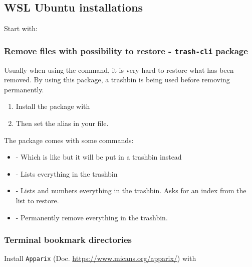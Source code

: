 \subsection{WSL Ubuntu installations} \label{sec:wsl_ubuntu_installations}

Start with:


\subsubsection{Remove files with possibility to restore - \texttt{trash-cli} package}

Usually when using the  command, it is very hard to restore what has been removed. By using this package, a trashbin is being used before removing permanently.

\begin{enumerate}
    \item Install the  package with 
    \item Then set the alias  in your  file.
\end{enumerate}


The  package comes with some commands:
\begin{itemize}
    \item {} - Which is like  but it will be put in a trashbin instead
    \item {} - Lists everything in the trashbin
    \item {} - Lists and numbers everything in the trashbin. Asks for an index from the list to restore.
    \item {} - Permanently remove everything in the trashbin.
\end{itemize}

\subsubsection{Terminal bookmark directories}
Install \texttt{Apparix} (Doc. \url{https://www.micans.org/apparix/}) with\\

